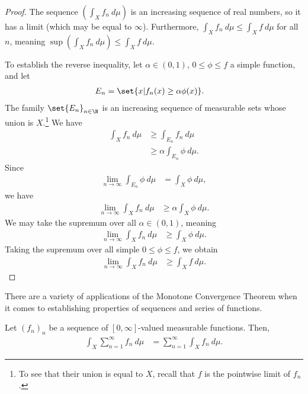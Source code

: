 \documentclass[12pt]{mypackage}
\begin{document}
\begin{proof}
  The sequence $\left( \int_{X}f_n\:d\mu \right)$ is an increasing sequence of real numbers, so it has a limit (which may be equal to $\infty$). Furthermore, $\int_{X}f_n\:d\mu \leq \int_{X}f\:d\mu$ for all $n$, meaning $\sup \left( \int_{X}^{} f_n\:d\mu \right) \leq \int_{X}^{} f\:d\mu$.\newline

  To establish the reverse inequality, let $\alpha\in (0,1)$, $0\leq \phi \leq f$ a simple function, and let
  \begin{align*}
    E_n &= \set{x | f_n(x) \geq \alpha \phi(x)}.
  \end{align*}
  The family $\set{E_n}_{n\in\N}$ is an increasing sequence of measurable sets whose union is $X$.\footnote{To see that their union is equal to $X$, recall that $f$ is the pointwise limit of $f_n$.} We have
  \begin{align*}
    \int_{X}^{} f_n\:d\mu &\geq \int_{E_n}^{} f_n\:d\mu\\
                          &\geq \alpha \int_{E_n}^{} \phi\:d\mu.
  \end{align*}
  Since
  \begin{align*}
    \lim_{n\rightarrow\infty} \int_{E_n}^{} \phi\:d\mu &= \int_{X}^{} \phi\:d\mu,
  \end{align*}
  we have
  \begin{align*}
    \lim_{n\rightarrow\infty} \int_{X}^{} f_n\:d\mu &\geq \alpha \int_{X}^{} \phi\:d\mu.
  \end{align*}
  We may take the supremum over all $\alpha\in (0,1)$, meaning
  \begin{align*}
    \lim_{n\rightarrow\infty} \int_{X}^{} f_n\:d\mu &\geq \int_{X}^{} \phi\:d\mu.
  \end{align*}
  Taking the supremum over all simple $0\leq \phi \leq f$, we obtain
  \begin{align*}
    \lim_{n\rightarrow\infty} \int_{X}^{} f_n\:d\mu &\geq \int_{X}^{} f\:d\mu.
  \end{align*}
\end{proof}
There are a variety of applications of the Monotone Convergence Theorem when it comes to establishing properties of sequences and series of functions.
\begin{theorem}
  Let $\left( f_n \right)_n$ be a sequence of $[0,\infty]$-valued measurable functions. Then,
  \begin{align*}
    \int_{X}^{} \sum_{n=1}^{\infty}f_n\:d\mu &= \sum_{n=1}^{\infty} \int_{X}^{} f_n\:d\mu.
  \end{align*}
\end{theorem}
\end{document}
